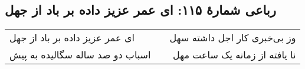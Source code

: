 \begin{center}
\section*{رباعی شمارهٔ ۱۱۵:  ای عمر عزیز داده بر باد از جهل}
\label{sec:115}
\begin{longtable}{l p{0.5cm} r}
 ای عمر عزیز داده بر باد از جهل
&&
وز بی‌خبری کار اجل داشته سهل
\\
اسباب دو صد ساله سگالیده به پیش
&&
نا یافته از زمانه یک ساعت مهل
\\
\end{longtable}
\end{center}
